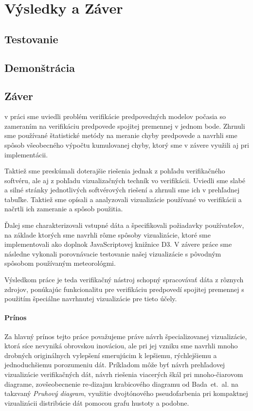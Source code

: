 \chapter{Výsledky a Záver}

\section{Testovanie}

\section{Demonštrácia}

\section{Záver}
v práci sme uviedli problém verifikácie predpovedných modelov počasia so zameraním na verifikáciu predpovede spojitej premennej v jednom bode. Zhrnuli sme používané štatistické metódy na meranie chyby predpovede a navrhli sme spôsob všeobecného výpočtu kumulovanej chyby, ktorý sme v závere využili aj pri implementácii.

Taktiež sme preskúmali doterajšie riešenia jednak z pohľadu verifikačného softvéru, ale aj z pohľadu vizualizačných techník vo verifikácii. Uviedli sme slabé a silné stránky jednotlivých softvérových riešení a zhrnuli sme ich v prehľadnej tabuľke. Taktiež sme opísali a analyzovali vizualizácie používané vo verifikácii a načrtli ich zameranie a spôsob použitia.

Ďalej sme charakterizovali vstupné dáta a špecifikovali požiadavky používateľov, na základe ktorých sme navrhli rôzne spôsoby vizualizácie, ktoré sme implementovali ako doplnok JavaScriptovej knižnice D3. V závere práce sme následne vykonali porovnávacie testovanie našej vizualizácie s pôvodným spôsobom používaným meteorológmi.

Výsledkom práce je teda verifikačný nástroj schopný spracovávať dáta z rôznych zdrojov, ponúkajúc funkcionalitu pre verifikáciu predpovedí spojitej premennej s použitím špeciálne navrhnutej vizualizácie pre tieto účely. 

\subsubsection{Prínos}

Za hlavný prínos tejto práce považujeme práve návrh špecializovanej vizualizácie, ktorá síce nevyniká obrovskou inováciou, ale pri jej vzniku sme navrhli mnoho drobných originálnych vylepšení smerujúcim k lepšiemu, rýchlejšiemu a jednoduchšiemu porozumeniu dát. Príkladom môže byť návrh prehľadovej vizualizácie verifikačných dát, návrh riešenia viacerých škál pri \mbox{mnoho-čiarovom} diagrame, zovšeobecnenie re-dizajnu krabicového diagramu od \mbox{Bada et. al.} \cite{Bade} na takzvaný \textit{Pruhový diagram}, využitie dvojtónového pseudofarbenia pri kompaktnej vizualizácii distribúcie dát pomocou grafu hustoty a podobne.

